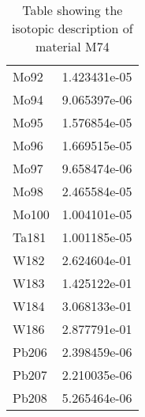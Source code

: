 \begin{centering}
\begin{table}[ht!]
\begin{tabular}{l | c}
Mo92 & 1.423431e-05\\
Mo94 & 9.065397e-06\\
Mo95 & 1.576854e-05\\
Mo96 & 1.669515e-05\\
Mo97 & 9.658474e-06\\
Mo98 & 2.465584e-05\\
Mo100 & 1.004101e-05\\
Ta181 & 1.001185e-05\\
W182 & 2.624604e-01\\
W183 & 1.425122e-01\\
W184 & 3.068133e-01\\
W186 & 2.877791e-01\\
Pb206 & 2.398459e-06\\
Pb207 & 2.210035e-06\\
Pb208 & 5.265464e-06
\end{tabular}
\caption{Table showing the isotopic description of material M74}
\label{table:material_M74}
\end{table}\clearpage


\end{centering}
